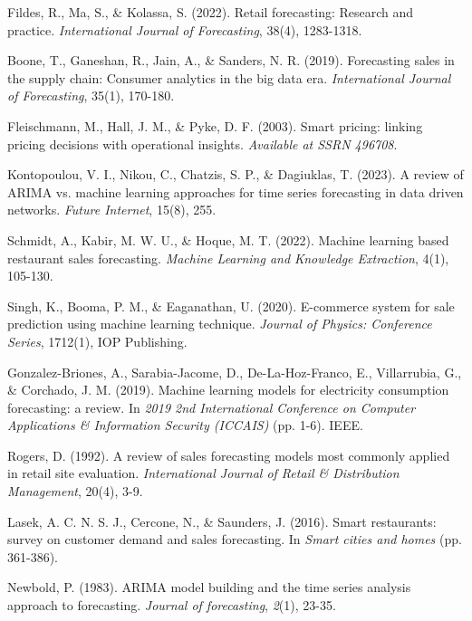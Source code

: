 \documentclass[preprint,12pt]{elsarticle}
\begin{document}
\begin{thebibliography}{99}

Fildes, R., Ma, S., \& Kolassa, S. (2022). Retail forecasting: Research and practice. \textit{International Journal of Forecasting}, 38(4), 1283-1318.

Boone, T., Ganeshan, R., Jain, A., \& Sanders, N. R. (2019). Forecasting sales in the supply chain: Consumer analytics in the big data era. \textit{International Journal of Forecasting}, 35(1), 170-180.

Fleischmann, M., Hall, J. M., \& Pyke, D. F. (2003). Smart pricing: linking pricing decisions with operational insights. \textit{Available at SSRN 496708}.

Kontopoulou, V. I., Nikou, C., Chatzis, S. P., \& Dagiuklas, T. (2023). A review of ARIMA vs. machine learning approaches for time series forecasting in data driven networks. \textit{Future Internet}, 15(8), 255.

Schmidt, A., Kabir, M. W. U., \& Hoque, M. T. (2022). Machine learning based restaurant sales forecasting. \textit{Machine Learning and Knowledge Extraction}, 4(1), 105-130.

Singh, K., Booma, P. M., \& Eaganathan, U. (2020). E-commerce system for sale prediction using machine learning technique. \textit{Journal of Physics: Conference Series}, 1712(1), IOP Publishing.

Gonzalez-Briones, A., Sarabia-Jacome, D., De-La-Hoz-Franco, E., Villarrubia, G., \& Corchado, J. M. (2019). Machine learning models for electricity consumption forecasting: a review. In \textit{2019 2nd International Conference on Computer Applications \& Information Security (ICCAIS)} (pp. 1-6). IEEE.

Rogers, D. (1992). A review of sales forecasting models most commonly applied in retail site evaluation. \textit{International Journal of Retail \& Distribution Management}, 20(4), 3-9.

Lasek, A. C. N. S. J., Cercone, N., \& Saunders, J. (2016). Smart restaurants: survey on customer demand and sales forecasting. In \textit{Smart cities and homes} (pp. 361-386). 

Newbold, P. (1983). ARIMA model building and the time series analysis approach to forecasting. \textit{Journal of forecasting}, \textit{2}(1), 23-35.


\end{thebibliography}
\end{document}
